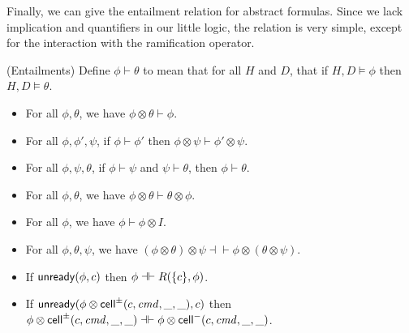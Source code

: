 Finally, we can give the entailment relation for abstract
formulas. Since we lack implication and quantifiers in our little
logic, the relation is very simple, except for the interaction 
with the ramification operator. 

\begin{prop}{(Entailments)}
Define $\phi \vdash \theta$ to mean that for all $H$ and $D$, that if $H, D \models \phi$ then 
$H, D \models \theta$. 

\begin{itemize}
\item For all $\phi, \theta$, we have $\phi \otimes \theta \vdash \phi$.
\item For all $\phi, \phi', \psi$, if $\phi \vdash \phi'$ then $\phi \otimes \psi \vdash \phi' \otimes \psi$.
\item For all $\phi, \psi, \theta$, if $\phi \vdash \psi$ and $\psi \vdash \theta$, then $\phi \vdash \theta$. 
\item For all $\phi, \theta$, we have $\phi \otimes \theta \vdash \theta \otimes \phi$. 
\item For all $\phi$, we have $\phi \vdash \phi \otimes I$. 
\item For all $\phi, \theta, \psi$, we have $(\phi \otimes \theta) \otimes \psi \dashv\vdash \phi \otimes (\theta \otimes \psi)$. 
\item If $\mathsf{unready}({\phi}, {c})$ then $\phi \dashv\vdash R(\{{c}\}, \phi)$.
\item If $\mathsf{unready}({\phi \otimes \mathsf{cell}^{\pm}({c}, {\mathit{cmd}}, {\_}, {\_})}, {c})$ then $\phi \otimes \mathsf{cell}^{\pm}({c}, {\mathit{cmd}}, {\_}, {\_}) \dashv\vdash \phi \otimes \mathsf{cell}^{-}({c}, {\mathit{cmd}}, {\_}, {\_})$.
\end{itemize}
\end{prop}

